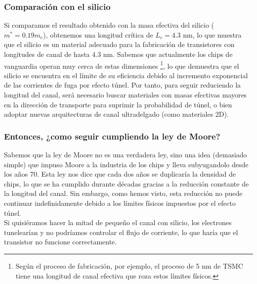 \subsubsection*{Comparación con el silicio}

Si comparamos el resultado obtenido con la masa efectiva del silicio ($m^* = 0.19 m_e$), obtenemos una longitud crítica de $L_c = 4.3$ nm, lo que muestra que el silicio es un material adecuado para la fabricación de transistores con longitudes de canal de hasta 4.3 nm. Sabemos que actualmente los chips de vanguardia operan muy cerca de estas dimensiones \footnote{Según el proceso de fabricación, por ejemplo, el proceso de 5 nm de TSMC tiene una longitud de canal efectiva que roza estos límites físicos.}, lo que demuestra que el silicio se encuentra en el límite de su eficiencia debido al incremento exponencial de las corrientes de fuga por efecto túnel. Por tanto, para seguir reduciendo la longitud del canal, será necesario buscar materiales con masas efectivas mayores en la dirección de transporte para suprimir la probabilidad de túnel, o bien adoptar nuevas arquitecturas de canal ultradelgado (como materiales 2D). \cite{wang2003tunneling}

\subsubsection*{Entonces, ¿como seguir cumpliendo la ley de Moore?}
Sabemos que la ley de Moore no es una verdadera ley, sino una idea (demasiado simple) que impuso Moore a la industria de los chips y lleva subyugandolo desde los años 70. Esta ley nos dice que cada dos años se duplicaría la densidad de chips, lo que se ha cumplido durante décadas gracias a la reducción constante de la longitud del canal. Sin embargo, como hemos visto, esta reducción no puede continuar indefinidamente debido a los límites físicos impuestos por el efecto túnel. \\

Si quisiéramos hacer la mitad de pequeño el canal con silicio, los electrones tunelearían y no podríamos controlar el flujo de corriente, lo que haría que el transistor no funcione correctamente.

